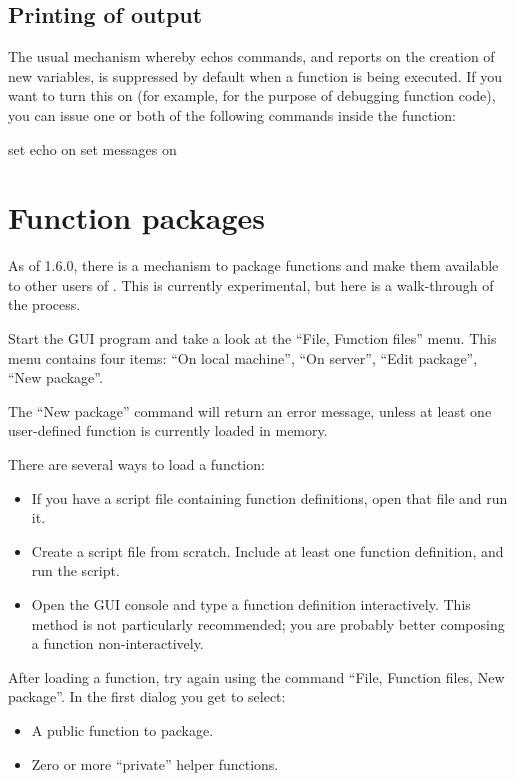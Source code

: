 \subsection{Printing of output}

The usual mechanism whereby  echos commands, and reports on
the creation of new variables, is suppressed by default when a
function is being executed.  If you want to turn this on (for example,
for the purpose of debugging function code), you can issue one or both
of the following commands inside the function:
%
\begin{code}
     set echo on
     set messages on
\end{code}

\section{Function packages}
\label{func-packages}

As of  1.6.0, there is a mechanism to package functions and
make them available to other users of .  This is currently
experimental, but here is a walk-through of the process.

Start the GUI program and take a look at the ``File, Function files'' menu.
This menu contains four items: ``On local machine'', ``On server'', ``Edit
package'', ``New package''.

The ``New package'' command will return an error message, unless at least one
user-defined function is currently loaded in memory.

There are several ways to load a function:

\begin{itemize}
\item If you have a script file containing function definitions, open
  that file and run it.
\item Create a script file from scratch.  Include at least one
  function definition, and run the script.
\item Open the GUI console and type a function definition
  interactively.  This method is not particularly recommended; you are
  probably better composing a function non-interactively.
\end{itemize}

After loading a function, try again using the command ``File, Function
files, New package''. In the first dialog you get to select:

\begin{itemize}
\item A public function to package.
\item Zero or more ``private'' helper functions.
\end{itemize}

